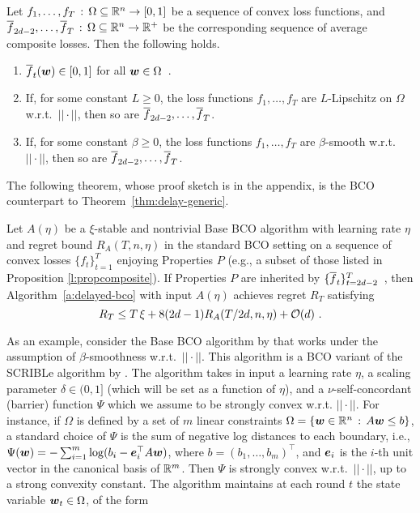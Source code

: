 %
\begin{proposition}\label{l:propcomposite}
Let $f_1,\ldots, f_T\,:\,\Omega \subseteq \mathbb{R}^n \to [0,1]$ be a sequence of convex loss functions, and ${\overline{f}}_{2d-2}, \ldots, {\overline{f}}_T \,:\,\Omega \subseteq \mathbb{R}^n \to \mathbb{R}^+$ be the corresponding sequence of average composite losses. Then the following holds.
\begin{enumerate}[topsep=0pt,parsep=0pt,itemsep=0pt]
\item
$
{\overline{f}}_{t}(\boldsymbol{w}) \in [0,1]
$ for all $\boldsymbol{w} \in \Omega$~.
\item If, for some constant $L \geq 0$, the loss functions $f_1,\ldots, f_T$ are $L$-Lipschitz on $\Omega$ w.r.t.\ $||\cdot||$, then so are ${\overline{f}}_{2d-2},\ldots, {\overline{f}}_T$.
\item If, for some constant $\beta \geq 0$, the loss functions $f_1,\ldots, f_T$ are $\beta$-smooth w.r.t.\ $||\cdot||$, then so are ${\overline{f}}_{2d-2},\ldots, {\overline{f}}_T$.
\end{enumerate}
\end{proposition}
%
The following theorem, whose proof sketch is in the appendix, is the BCO counterpart to Theorem~\ref{thm:delay-generic}.
%
\begin{theorem}\label{thm:convex}
Let $A(\eta)$ be a $\xi$-stable and nontrivial Base BCO algorithm with learning rate $\eta$ and regret bound
$R_A(T,n,\eta)$ in the standard BCO setting on a sequence of convex losses $\{f_t\}_{t=1}^T$ enjoying Properties $P$ (e.g., a subset of those listed in Proposition \ref{l:propcomposite}). If Properties $P$ are inherited by $\{{\overline{f}}_t\}_{t=2d-2}^T$~, then Algorithm~\ref{a:delayed-bco} with input $A(\eta)$ achieves regret $R_T$ satisfying
\[
R_T
\le
T\,\xi + 8(2d-1)R_A(T/2d,n,\eta)+\mathcal{O}(d)~.
\]
\end{theorem}
%
%
As an example, consider the Base BCO algorithm by \citet{st11} that works under the assumption of $\beta$-smoothness w.r.t.\ $||\cdot||$. This algorithm is a BCO variant of the SCRIBLe algorithm by \citet{ahr12}. The algorithm takes in input a learning rate $\eta$, a scaling parameter $\delta \in (0,1]$ (which will be set as a function of $\eta$), and a $\nu$-self-concordant (barrier) function $\Psi$ which we assume to be strongly convex w.r.t. $||\cdot||$. For instance, if $\Omega$ is defined by a set of $m$ linear constraints $\Omega = \{\boldsymbol{w} \in \mathbb{R}^n\,:\, A\boldsymbol{w} \leq b \}$, a standard choice of $\Psi$ is the sum of negative log distances to each boundary, i.e., $\Psi(\boldsymbol{w}) = -\sum_{i=1}^m \log(b_i - \boldsymbol{e}_i^\top A\boldsymbol{w})$, where $b = (b_1,\ldots, b_m)^\top$, and $\boldsymbol{e}_i$ is the $i$-th unit vector in the canonical basis of $\mathbb{R}^m$. Then $\Psi$ is strongly convex w.r.t.\ $||\cdot||$, up to a strong convexity constant. The algorithm maintains at each round $t$ the state variable $\boldsymbol{w}_t \in \Omega$, of the form
